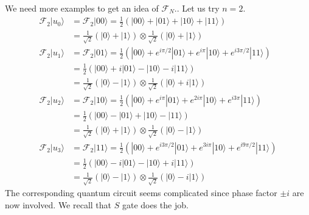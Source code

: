 \documentclass[letterpaper,10pt,english]{jupyterBook}
\begin{document}
\sphinxAtStartPar
{}

\sphinxAtStartPar
We need more examples to get an idea of \(\mathcal{F}_N\)..  Let us try \(n=2\).
\begin{align}
\mathcal{F}_2 |u_0\rangle &=\mathcal{F}_2 |00\rangle = \frac{1}{2} \left(|00\rangle + |01\rangle  +|10\rangle + |11\rangle\right)\\ &= \frac{1}{\sqrt{2}} \left(|0\rangle + |1\rangle\right) \otimes
\frac{1}{\sqrt{2}} \left(|0\rangle + |1\rangle\right) \\
\mathcal{F}_2 |u_1\rangle &= \mathcal{F}_2 |01\rangle = \frac{1}{2} \left(|00\rangle + e^{i \pi/2}|01\rangle + e^{i \pi}|10\rangle + e^{i 3\pi/2}|11\rangle \right)\\
&= \frac{1}{2} \left(|00\rangle + i |01\rangle  - |10\rangle  -i |11\rangle \right)\\& = \frac{1}{\sqrt{2}} \left(|0\rangle -  |1\rangle\right) \otimes \frac{1}{\sqrt{2}} \left(|0\rangle + i |1\rangle\right) \\
\mathcal{F}_2 |u_2\rangle &= \mathcal{F}_2 |10\rangle = \frac{1}{2} \left(|00\rangle + e^{i \pi}|01\rangle + e^{2 i \pi}|10\rangle + e^{i 3 \pi}|11\rangle \right) \\
&= \frac{1}{2} \left(|00\rangle - |01\rangle +|10\rangle - |11\rangle \right) \\
&=  \frac{1}{\sqrt{2}} \left(|0\rangle + |1\rangle\right) \otimes \frac{1}{\sqrt{2}} \left(|0\rangle - |1\rangle\right)\\
\mathcal{F}_2 |u_3\rangle &= \mathcal{F}_2 |11\rangle = \frac{1}{2} \left(|00\rangle + e^{i 3\pi/2}|01\rangle + e^{3 i \pi}|10\rangle + e^{i 9 \pi/2} |11\rangle \right) \\
&= \frac{1}{2} \left(|00\rangle - i|01\rangle - |10\rangle + i |11\rangle \right) \\
&=  \frac{1}{\sqrt{2}} \left(|0\rangle - |1\rangle\right) \otimes \frac{1}{\sqrt{2}} \left(|0\rangle -i |1\rangle\right)\label{equation:algorithms/qft:qft4}
\end{align}
\sphinxAtStartPar
The corresponding quantum circuit seems complicated since phase factor \(\pm i\) are now involved.  We recall that \(S\) gate does the job.
\end{document}
